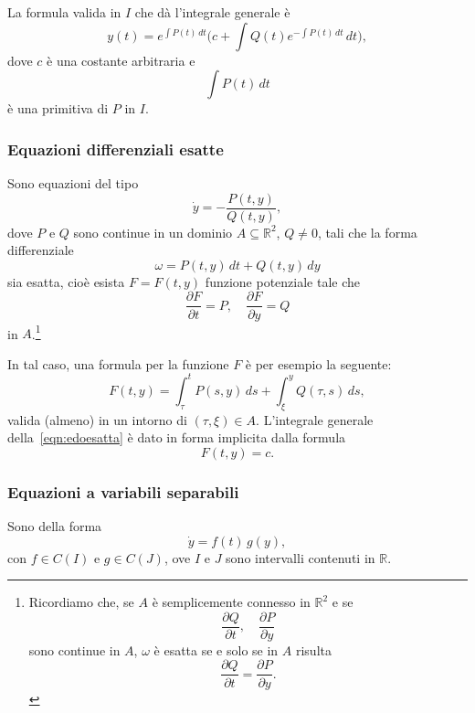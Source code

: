 \documentclass[a4paper]{book}
\numberwithin{equation}{section}
\theoremstyle{plain}
\theoremstyle{definition}
\theoremstyle{remark}
\theoremstyle{example}
\begin{document}
La formula valida in $I$ che dà l'integrale generale è
	\begin{equation}
		\label{eqn:soledolin}
y(t) = e^{\int P(t)\,dt}\Biggl( c + \int Q(t) e^{-\int P(t)\,dt}\,dt \Biggr),
	\end{equation}
dove $c$ è una costante arbitraria e
	\begin{equation*}
		\int P(t)\,dt
	\end{equation*}
è una primitiva di $P$ in $I$.

\subsubsection*{Equazioni differenziali esatte}
Sono equazioni del tipo
	\begin{equation}
		\label{eqn:edoesatta}
		\dot{y} =  - \frac{P(t,y)}{Q(t, y)},
	\end{equation}
dove $P$ e $Q$ sono continue in un dominio $A \subseteq \mathbb{R}^2$, $Q \ne 0$, tali che la forma differenziale
	\begin{equation*}
		\omega = P(t,y)\,dt + Q(t,y)\,dy
	\end{equation*}
sia esatta, cioè esista $F=F(t,y)$ funzione potenziale tale che
	\begin{equation*}
		\frac{\partial F}{\partial t} = P, \quad \frac{\partial F}{\partial y} = Q
	\end{equation*}
in $A$.\footnote{Ricordiamo che, se $A$ è semplicemente connesso in $\mathbb{R}^2$ e se
	\begin{equation*}
		\frac{\partial Q}{\partial t}, \quad \frac{\partial P}{\partial y}
	\end{equation*}
sono continue in $A$, $\omega$ è esatta se e solo se in $A$ risulta
	\begin{equation*}
		\frac{\partial Q}{\partial t} = \frac{\partial P}{\partial y}.
	\end{equation*}}

	In tal caso, una formula per la funzione $F$ è per esempio la seguente:
		\begin{equation}
			F(t,y) = \int_{\tau}^t P(s, y)\,ds + \int_{\xi}^y Q(\tau, s)\,ds,
		\end{equation}
	valida (almeno) in un intorno di $(\tau, \xi) \in A$. L'integrale generale della~\eqref{eqn:edoesatta} è dato in forma implicita dalla formula
		\begin{equation}
			F(t, y) = c.
		\end{equation}

		\subsubsection*{Equazioni a variabili separabili}
		Sono della forma
			\begin{equation}
				\label{eqn:edovarsep}
				\dot{y} = f(t)\,g(y),
			\end{equation}
		con $f \in C(I)$ e $g \in C(J)$, ove $I$ e $J$ sono intervalli contenuti in $\mathbb{R}$.
\end{document}
